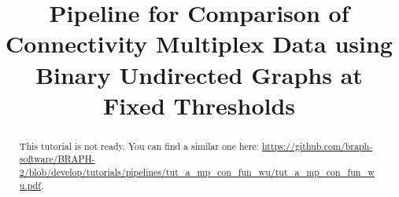 \documentclass[justified]{tufte-handout}
\title[Comparison of Connectivity Multiplex Data using BUT]{Pipeline for Comparison of Connectivity Multiplex Data using Binary Undirected Graphs at Fixed Thresholds}
\begin{document}
\maketitle

\begin{abstract}
\noindent
This tutorial is not ready. You can find a similar one here: \url{https://github.com/braph-software/BRAPH-2/blob/develop/tutorials/pipelines/tut_a_mp_con_fun_wu/tut_a_mp_con_fun_wu.pdf}.
\end{abstract}
\end{document}

